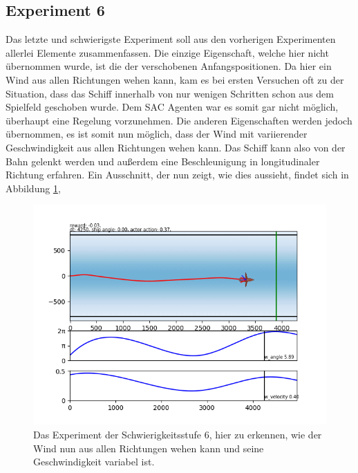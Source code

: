 \documentclass[]{iat}
\begin{document}
\subsection*{Experiment 6}
Das letzte und schwierigste Experiment soll aus den vorherigen Experimenten allerlei Elemente zusammenfassen. Die einzige Eigenschaft, welche hier nicht übernommen wurde, ist die der verschobenen Anfangspositionen. Da hier ein Wind aus allen Richtungen wehen kann, kam es bei ersten Versuchen oft zu der Situation, dass das Schiff innerhalb von nur wenigen Schritten schon aus dem Spielfeld geschoben wurde. Dem SAC Agenten war es somit gar nicht möglich, überhaupt eine Regelung vorzunehmen. Die anderen Eigenschaften werden jedoch übernommen, es ist somit nun möglich, dass der Wind mit variierender Geschwindigkeit aus allen Richtungen wehen kann. Das Schiff kann also von der Bahn gelenkt werden und außerdem eine Beschleunigung in longitudinaler Richtung erfahren. Ein Ausschnitt, der nun zeigt, wie dies aussieht, findet sich in Abbildung \ref{abb:setting6},
\begin{figure}[H]
    \includegraphics[width=\textwidth]{graphics/settings/s6.png}
    \centering
    \caption{Das Experiment der Schwierigkeitsstufe 6, hier zu erkennen, wie der Wind nun aus allen Richtungen wehen kann und seine Geschwindigkeit variabel ist.}
    \label{abb:setting6}
\end{figure}
\end{document}
